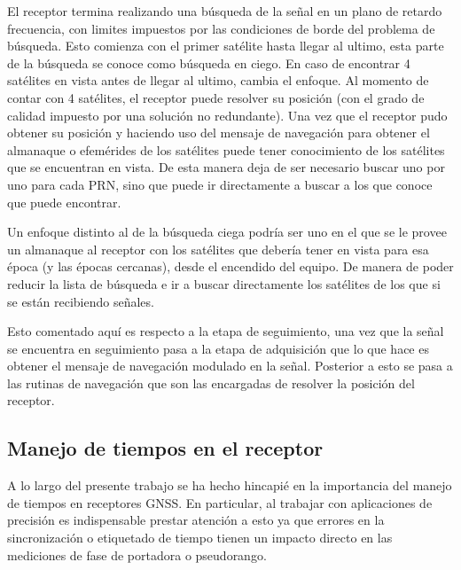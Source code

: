 \documentclass[a4paper,12pt,oneside,onecolumn,final,openright]{book}%
\begin{document}
	El receptor termina realizando una búsqueda de la señal en un plano de retardo frecuencia, con limites impuestos por las condiciones de borde del problema de búsqueda. Esto comienza con el primer satélite hasta llegar al ultimo, esta parte de la búsqueda se conoce como búsqueda en ciego. En caso de encontrar 4 satélites en vista antes de llegar al ultimo, cambia el enfoque. Al momento de contar con 4 satélites, el receptor puede resolver su posición (con el grado de calidad impuesto por una solución no redundante). Una vez que el receptor pudo obtener su posición y haciendo uso del mensaje de navegación para obtener el almanaque o efemérides de los satélites puede tener conocimiento de los satélites que se encuentran en vista. De esta manera deja de ser necesario buscar uno por uno para cada PRN, sino que puede ir directamente a buscar a los que conoce que puede encontrar.
	
	Un enfoque distinto al de la búsqueda ciega podría ser uno en el que se le provee un almanaque al receptor con los satélites que debería tener en vista para esa época (y las épocas cercanas), desde el encendido del equipo. De manera de poder reducir la lista de búsqueda e ir a buscar directamente los satélites de los que si se están recibiendo señales.
	
	Esto comentado aquí es respecto a la etapa de seguimiento, una vez que la señal se encuentra en seguimiento pasa a la etapa de adquisición que lo que hace es obtener el mensaje de navegación modulado en la señal. Posterior a esto se pasa a las rutinas de navegación que son las encargadas de resolver la posición del receptor.
\subsection{Manejo de tiempos en el receptor}
	A lo largo del presente trabajo se ha hecho hincapié en la importancia del manejo de tiempos en receptores GNSS. En particular, al trabajar con aplicaciones de precisión es indispensable prestar atención a esto ya que errores en la sincronización o etiquetado de tiempo tienen un impacto directo en las mediciones de fase de portadora o pseudorango. 
	
\end{document}
